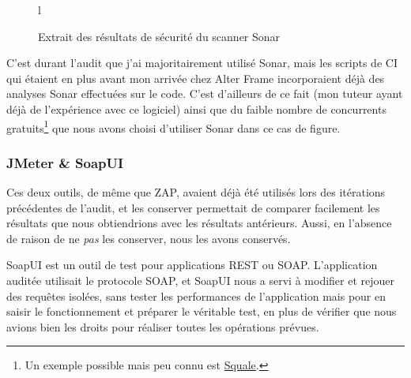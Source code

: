 \begin{figure}{l}
	\caption{Extrait des résultats de sécurité du scanner Sonar}
	\label{fig:sonar_sec}
\end{figure}

C'est durant l'audit que j'ai majoritairement utilisé Sonar, mais les scripts de CI qui étaient en plus avant mon arrivée chez Alter Frame incorporaient déjà des analyses Sonar effectuées sur le code. C'est d'ailleurs de ce fait (mon tuteur ayant déjà de l'expérience avec ce logiciel) ainsi que du faible nombre de concurrents gratuits\footnote{Un exemple possible mais peu connu est \href{http://www.squale.org/}{Squale}.} que nous avons choisi d'utiliser Sonar dans ce cas de figure.

\subsubsection{JMeter \& SoapUI}
Ces deux outils, de même que ZAP, avaient déjà été utilisés lors des itérations précédentes de l'audit, et les conserver permettait de comparer facilement les résultats que nous obtiendrions avec les résultats antérieurs. Aussi, en l'absence de raison de ne \emph{pas} les conserver, nous les avons conservés.

SoapUI\cite{soapui} est un outil de test pour applications REST ou SOAP. L'application auditée utilisait le protocole SOAP, et SoapUI nous a servi à modifier et rejouer des requêtes isolées, sans tester les performances de l'application mais pour en saisir le fonctionnement et préparer le véritable test, en plus de vérifier que nous avions bien les droits pour réaliser toutes les opérations prévues.

